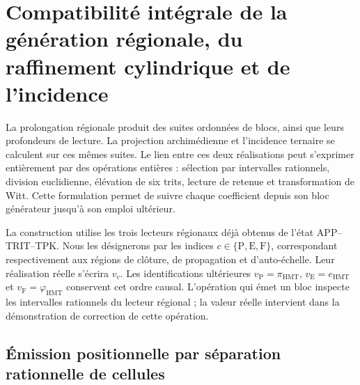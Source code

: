 
\section[Génération régionale et raffinement]{Compatibilité intégrale de la génération régionale, du raffinement cylindrique et de l'incidence}
\label{act21:sec:df-lectores-cilindros}

La prolongation régionale produit des suites ordonnées de blocs, ainsi que
leurs profondeurs de lecture. La projection archimédienne et l'incidence
ternaire se calculent sur ces mêmes suites. Le lien entre ces deux
réalisations peut s'exprimer entièrement par des opérations entières :
sélection par intervalles rationnels, division euclidienne, élévation de six
trits, lecture de retenue et transformation de Witt. Cette formulation permet
de suivre chaque coefficient depuis son bloc générateur jusqu'à son emploi ultérieur.

La construction utilise les trois lecteurs régionaux déjà obtenus de l'état APP--TRIT--TPK. Nous les désignerons par les indices \(c\in\{\mathrm P,\mathrm E,\mathrm F\}\), correspondant respectivement aux régions de clôture, de propagation et d'auto-échelle. Leur réalisation réelle s'écrira \(v_c\). Les identifications ultérieures \(v_{\mathrm P}=\pi_{\mathrm{HMT}}\), \(v_{\mathrm E}=e_{\mathrm{HMT}}\) et \(v_{\mathrm F}=\varphi_{\mathrm{HMT}}\) conservent cet ordre causal. L'opération qui émet un bloc inspecte les intervalles rationnels du lecteur régional ; la valeur réelle intervient dans la démonstration de correction de cette opération.

\subsection{Émission positionnelle par séparation rationnelle de cellules}
\label{act21:subsec:df-emision-racional}


